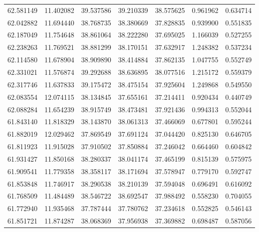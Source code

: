 \begin{tabular}{rrrrrrr}
 62.581149 &  11.402082 &         39.537586 &         39.210339 &         38.575625 &  0.961962 &  0.634714 \\
 62.042882 &  11.694440 &         38.768735 &         38.380669 &         37.828835 &  0.939900 &  0.551835 \\
 62.187049 &  11.754648 &         38.861064 &         38.222280 &         37.695025 &  1.166039 &  0.527255 \\
 62.238263 &  11.769521 &         38.881299 &         38.170151 &         37.632917 &  1.248382 &  0.537234 \\
 62.114580 &  11.678904 &         38.909890 &         38.414884 &         37.862135 &  1.047755 &  0.552749 \\
 62.331021 &  11.576874 &         39.292688 &         38.636895 &         38.077516 &  1.215172 &  0.559379 \\
 62.317746 &  11.637833 &         39.175472 &         38.475154 &         37.925604 &  1.249868 &  0.549550 \\
 62.083554 &  12.074115 &         38.134845 &         37.655161 &         37.214411 &  0.920434 &  0.440749 \\
 62.088284 &  11.654239 &         38.915749 &         38.473481 &         37.921436 &  0.994313 &  0.552044 \\
 61.843140 &  11.818329 &         38.143870 &         38.061313 &         37.466069 &  0.677801 &  0.595244 \\
 61.882019 &  12.029462 &         37.869549 &         37.691124 &         37.044420 &  0.825130 &  0.646705 \\
 61.811923 &  11.915028 &         37.910502 &         37.850884 &         37.246042 &  0.664460 &  0.604842 \\
 61.931427 &  11.850168 &         38.280337 &         38.041174 &         37.465199 &  0.815139 &  0.575975 \\
 61.909541 &  11.779358 &         38.358117 &         38.171694 &         37.578947 &  0.779170 &  0.592747 \\
 61.853848 &  11.746917 &         38.290538 &         38.210139 &         37.594048 &  0.696491 &  0.616092 \\
 61.768509 &  11.484489 &         38.546722 &         38.692547 &         37.988492 &  0.558230 &  0.704055 \\
 61.772940 &  11.935468 &         37.787444 &         37.780762 &         37.234618 &  0.552825 &  0.546143 \\
 61.851721 &  11.874287 &         38.068369 &         37.956938 &         37.369882 &  0.698487 &  0.587056 \\

\end{tabular}
